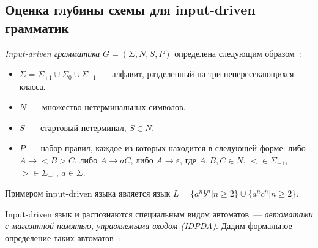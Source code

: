 \subsection{Оценка глубины схемы для input-driven грамматик}
\textit{Input-driven грамматика} $G = ( \Sigma, N, S, P)$ определена следующим образом~\cite{IDGrammar}:
\begin{itemize}
	\item $\Sigma = \Sigma_{+1} \cup \Sigma_0 \cup \Sigma_{-1}$~--- алфавит, разделенный на три непересекающихся класса.
	\item $N$~--- множество нетерминальных символов.
         \item $S$~--- стартовый нетерминал, $S \in N$.
	\item $P$~--- набор правил, каждое из которых находится в следующей форме: либо $A \rightarrow <B>C$, либо $A \rightarrow aC$, либо $A \rightarrow \varepsilon$, где $A, B, C \in N$, $< \in \Sigma_{+1}$, $> \in \Sigma_{-1}$, $a \in \Sigma$.
\end{itemize}
Примером input-driven языка является язык $L = \{a^nb^n | n \ge 2\} \cup \{a^nc^n | n \ge 2\}$.

Input-driven язык и распознаются специальным видом автоматов~--- \textit{автоматами с магазинной памятью, управляемыми входом (IDPDA)}. Дадим формальное определение таких автоматов~\cite{OkhotinIDPDA}:

